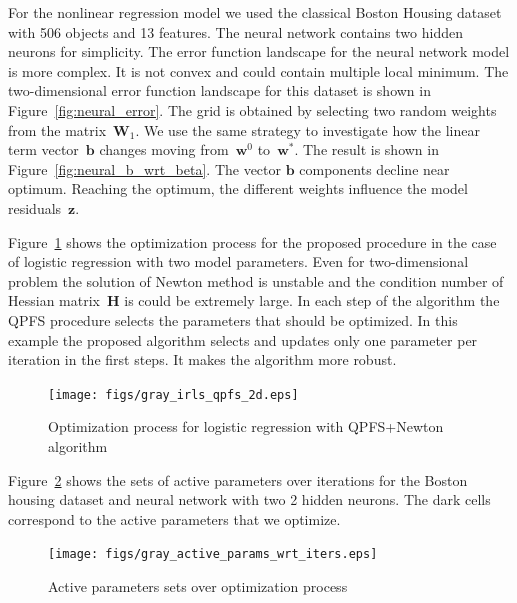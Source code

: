 \documentclass[
11pt,%
tightenlines,%
twoside,%
onecolumn,%
nofloats,%
nobibnotes,%
nofootinbib,%
superscriptaddress,%
noshowpacs,%
centertags]%
{revtex4}
\newcommand{\bb}{\mathbf{b}}
\newcommand{\bw}{\mathbf{w}}
\newcommand{\bz}{\mathbf{z}}
\newcommand{\bW}{\mathbf{W}}
\newcommand{\bH}{\mathbf{H}}
\begin{document}
For the nonlinear regression model we used the classical Boston Housing dataset with 506 objects and 13 features.
The neural network contains two hidden neurons for simplicity.
The error function landscape for the neural network model is more complex. 
It is not convex and could contain multiple local minimum.
The two-dimensional error function landscape for this dataset is shown in Figure~\ref{fig:neural_error}. 
The grid is obtained by selecting two random weights from the matrix~$\bW_1$.
We use the same strategy to investigate how the linear term vector~$\bb$ changes moving from~$\bw^0$ to~$\bw^*$. 
The result is shown in Figure~\ref{fig:neural_b_wrt_beta}.
The vector $\bb$ components decline near optimum. 
Reaching the optimum, the different weights influence the model residuals~$\bz$.

Figure~\ref{fig:irls_qpfs_2d} shows the optimization process for the proposed procedure in the case of logistic regression with two model parameters. 
Even for two-dimensional problem the solution of Newton method is unstable and the condition number of Hessian matrix~$\bH$ is could be extremely large. 
In each step of the algorithm the QPFS procedure selects the parameters that should be optimized. 
In this example the proposed algorithm selects and updates only one parameter per iteration in the first steps. 
It makes the algorithm more robust.
\begin{figure}[!h]
	\setcaptionmargin{5mm}
	\onelinecaptionsfalse %
	\centering
	\texttt{[image: figs/gray\_irls\_qpfs\_2d.eps]}	 
	\caption{Optimization process for logistic regression with QPFS+Newton algorithm}
	\label{fig:irls_qpfs_2d}
\end{figure}

Figure~\ref{fig:active_params_wrt_iters} shows the sets of active parameters over iterations for the Boston housing dataset and neural network with two 2 hidden neurons. 
The dark cells correspond to the active parameters that we optimize.

\begin{figure}[!h]
	\setcaptionmargin{5mm}
	\onelinecaptionsfalse %
	\centering
	\texttt{[image: figs/gray\_active\_params\_wrt\_iters.eps]}	
	\caption{Active parameters sets over optimization process}
	\label{fig:active_params_wrt_iters}
\end{figure}
\end{document}
